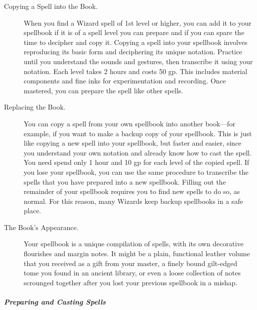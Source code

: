 \begin{description}
\item[Copying a Spell into the Book.]
When you find a Wizard spell of 1st level or higher, you can add it to
your spellbook if it is of a spell level you can prepare and if you can
spare the time to decipher and copy it. Copying a spell into your
spellbook involves reproducing its basic form and deciphering its unique
notation. Practice until you understand the sounds and gestures, then
transcribe it using your notation. Each level takes 2 hours and costs 50
gp. This includes material components and fine inks for experimentation
and recording. Once mastered, you can prepare the spell like other
spells.
\item[Replacing the Book.]
You can copy a spell from your own spellbook into another book---for
example, if you want to make a backup copy of your spellbook. This is
just like copying a new spell into your spellbook, but faster and
easier, since you understand your own notation and already know how to
cast the spell. You need spend only 1 hour and 10 gp for each level of
the copied spell. If you lose your spellbook, you can use the same
procedure to transcribe the spells that you have prepared into a new
spellbook. Filling out the remainder of your spellbook requires you to
find new spells to do so, as normal. For this reason, many Wizards keep
backup spellbooks in a safe place.
\item[The Book's Appearance.]
Your spellbook is a unique compilation of spells, with its own
decorative flourishes and margin notes. It might be a plain, functional
leather volume that you received as a gift from your master, a finely
bound gilt-edged tome you found in an ancient library, or even a loose
collection of notes scrounged together after you lost your previous
spellbook in a mishap.
\end{description}

\subparagraph{Preparing and Casting
Spells}\label{_preparing_and_casting_spells_3}


